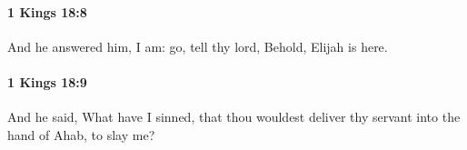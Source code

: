 		\paragraph{1 Kings 18:8} %
			\label{1KINGS-18-8}

			And he answered him, I am: go, tell thy lord, Behold, Elijah is here.


		\paragraph{1 Kings 18:9} %
			\label{1KINGS-18-9}

			And he said, What have I sinned, that thou wouldest deliver thy servant into the hand of Ahab, to slay me?


